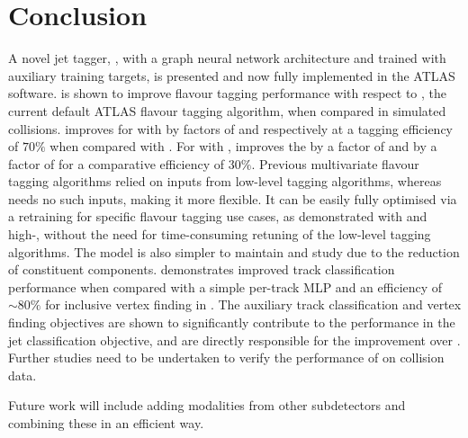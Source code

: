 \section{Conclusion}\label{sec:gnn_conclusion}


A novel jet tagger, \GNN, with a graph neural network architecture and trained with auxiliary training targets, is presented and now fully implemented in the ATLAS software.
\GNN is shown to improve flavour tagging performance with respect to \DLr, the current default ATLAS flavour tagging algorithm, when compared in simulated collisions.
\GNN improves \clrej for \ttbarjets with \ttbarpt by factors of \ttbclo and \ttbllo respectively at a \bjet tagging efficiency of $70\%$ when compared with \DLr.
For \Zprimejets with \Zprimept, \GNN improves the \crej by a factor of \zpbclo and \lrej by a factor of \zpbllo for a comparative \bjet efficiency of $30\%$.
Previous multivariate flavour tagging algorithms relied on inputs from low-level tagging algorithms, whereas \GNN needs no such inputs, making it more flexible. It can be easily fully optimised via a retraining for specific flavour tagging use cases, as demonstrated with \ctag and high-\pt \btag, without the need for time-consuming retuning of the low-level tagging algorithms.
The model is also simpler to maintain and study due to the reduction of constituent components.
\GNN demonstrates improved track classification performance when compared with a simple per-track MLP and an efficiency of $\sim80\%$ for inclusive vertex finding in \bjets.
The auxiliary track classification and vertex finding objectives are shown to significantly contribute to the performance in the jet classification objective, and are directly responsible for the improvement over \DLr.
Further studies need to be undertaken to verify the performance of \GNN on collision data.

Future work will include adding modalities from other subdetectors and combining these in an efficient way.